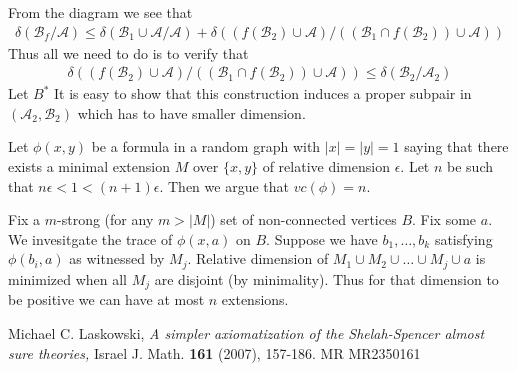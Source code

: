 \documentclass{amsart}
\newcommand{\A}{\mathcal A}
\newcommand{\B}{\mathcal B}
\begin{document}
From the diagram we see that
\begin{align*}
	\delta(\B_f/\A) \leq \delta(\B_1 \cup \A/\A) + \delta\left((f(\B_2) \cup \A)/((\B_1 \cap f(\B_2)) \cup \A)\right)
\end{align*}
Thus all we need to do is to verify that
\begin{align*}
	\delta\left((f(\B_2) \cup \A)/((\B_1 \cap f(\B_2)) \cup \A)\right) \leq \delta (\B_2/\A_2)
\end{align*}
Let $B^*$
It is easy to show that this construction induces a proper subpair in $(\A_2, \B_2)$ which has to have smaller dimension.



Let $\phi(x,y)$ be a formula in a random graph with $|x|=|y|=1$ saying that there exists a minimal extension $M$ over $\{x,y\}$ of relative dimension $\epsilon$. Let $n$ be such that $n\epsilon < 1 < (n+1)\epsilon$. Then we argue that $vc(\phi) = n$.

Fix a $m$-strong (for any $m > |M|$) set of non-connected vertices $B$. Fix some $a$. We invesitgate the trace of $\phi(x, a)$ on $B$. Suppose we have $b_1, \ldots, b_k$ satisfying $\phi(b_i, a)$ as witnessed by $M_j$. Relative dimension of $M_1 \cup M_2 \cup \ldots \cup M_j \cup {a}$ is minimized when all $M_j$ are disjoint (by minimality). Thus for that dimension to be positive we can have at most $n$ extensions.

\begin{thebibliography}{9}

	Michael C. Laskowski, \textsl{A simpler axiomatization of the Shelah-Spencer almost sure theories,}
	Israel J. Math. \textbf{161} (2007), 157-186. MR MR2350161

\end{thebibliography}
\end{document}
